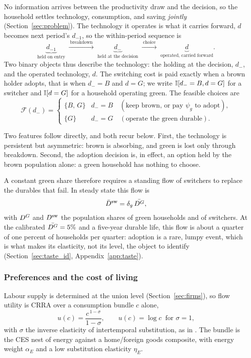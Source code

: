 No information arrives between the productivity draw and the decision, so the
household settles technology, consumption, and saving \emph{jointly}
(Section~\ref{sec:problem}). The technology it operates is what it carries
forward, $d$ becomes next period's $d_{-1}$, so the within-period sequence is
%
\[
\underbrace{d_{-1}}_{\text{held on entry}}
\;\xrightarrow{\ \text{breakdown}\ }\;
\underbrace{d_-}_{\text{held at the decision}}
\;\xrightarrow{\ \text{choice}\ }\;
\underbrace{d}_{\text{operated, carried forward}}.
\]
%
Two binary objects thus describe the technology: the holding at the decision, $d_-$,
and the operated technology, $d$. The switching cost is paid exactly when a brown
holder adopts, that is when $d_-=B$ and $d=G$; we write $\mathbb{I}[d_-=B, d=G]$ for a switcher
and $\mathbb{I}[d=G]$ for a household operating green. The feasible choices are
%
\[
\mathcal F(d_-)=
\begin{cases}
\{B,\,G\} & d_-=B \quad(\text{keep brown, or pay $\psi_g$ to adopt}),\\[2pt]
\{G\} & d_-=G \quad(\text{operate the green durable}).
\end{cases}
\]

Two features follow directly, and both recur below. First, the technology is
persistent but asymmetric: brown is absorbing, and green is lost only through
breakdown. Second, the adoption decision is, in effect, an option held by the brown
population alone: a green household has nothing to choose.

A constant green share therefore requires a standing flow of switchers to replace the
durables that fail. In steady state this flow is
%
\begin{equation}
\bar D^{\mathrm{sw}}=\delta_g\,\bar{D^{G}},
\label{eq:switch-flow}
\end{equation}
%
with $D^{G}$ and $D^{\mathrm{sw}}$ the population shares of green households and of switchers. At
the calibrated $\bar{D^{G}}=5\%$ and a five-year durable life, this flow is about a
quarter of one percent of households per quarter: adoption is a rare, lumpy event,
which is what makes its elasticity, not its level, the object to identify
(Section~\ref{sec:taste_id}, Appendix~\ref{app:taste}).

\subsubsection{Preferences and the cost of living}\label{sec:prefs}

Labour supply is determined at the union level (Section~\ref{sec:firms}), so flow
utility is CRRA over a consumption bundle $c$ alone,
%
\begin{equation}
u(c)=\frac{c^{\,1-\sigma}}{1-\sigma},
\qquad
u(c)=\log c \ \text{ for } \sigma=1,
\label{eq:felicity}
\end{equation}
%
with $\sigma$ the inverse elasticity of intertemporal substitution, as in \citet{ARS2024}. The bundle is the
\citet{ARS2024} CES nest of energy against a home/foreign goods composite, with
energy weight $\alpha_E$ and a low substitution elasticity $\eta_E$.

